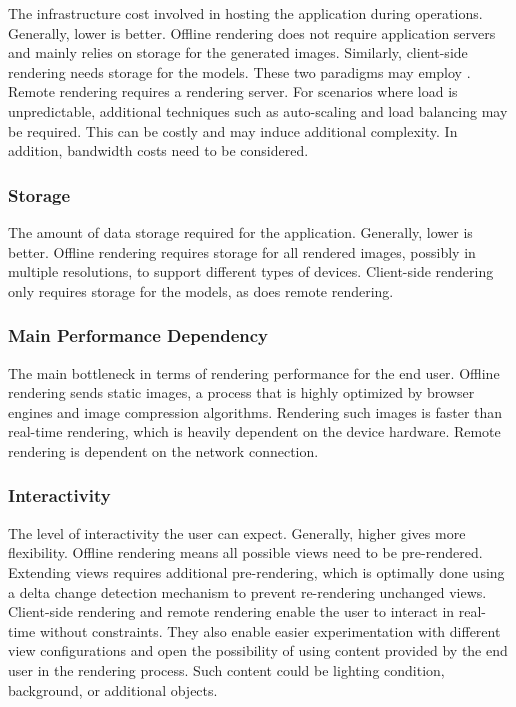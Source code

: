 The infrastructure cost involved in hosting the application during operations. Generally, lower is better. Offline rendering does not require application servers and mainly relies on storage for the generated images. Similarly, client-side rendering needs storage for the models. These two paradigms may employ . Remote rendering requires a rendering server. For scenarios where load is unpredictable, additional techniques such as auto-scaling and load balancing may be required. This can be costly and may induce additional complexity. In addition, bandwidth costs need to be considered.

\subsubsection{Storage}

The amount of data storage required for the application. Generally, lower is better. Offline rendering requires storage for all rendered images, possibly in multiple resolutions, to support different types of devices. Client-side rendering only requires storage for the models, as does remote rendering.

\subsubsection{Main Performance Dependency}

The main bottleneck in terms of rendering performance for the end user. Offline rendering sends static images, a process that is highly optimized by browser engines and image compression algorithms. Rendering such images is faster than real-time rendering, which is heavily dependent on the device hardware. Remote rendering is dependent on the network connection.

\subsubsection{Interactivity}

The level of interactivity the user can expect. Generally, higher gives more flexibility. Offline rendering means all possible views need to be pre-rendered. Extending views requires additional pre-rendering, which is optimally done using a delta change detection mechanism to prevent re-rendering unchanged views. Client-side rendering and remote rendering enable the user to interact in real-time without constraints. They also enable easier experimentation with different view configurations and open the possibility of using content provided by the end user in the rendering process. Such content could be lighting condition, background, or additional objects.


